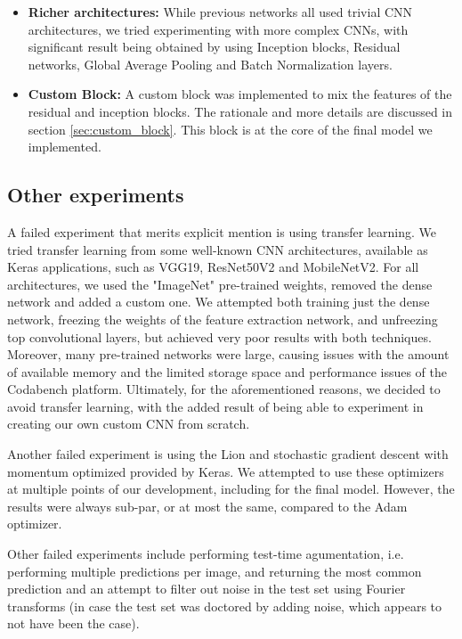 \documentclass[11pt]{article}
\begin{document}
\begin{multicols}{2}
\begin{itemize}
            \item \textbf{Richer architectures:} While previous networks all used trivial 
                  CNN architectures, we tried experimenting with more complex CNNs,
                  with significant result being obtained by using Inception blocks,
                  Residual networks, Global Average Pooling and Batch Normalization layers.
            \item \textbf{Custom Block:} A custom block was implemented to mix the 
                  features of the residual and inception blocks. The rationale and more
                  details are discussed in section \ref{sec:custom_block}. This block 
                  is at the core of the final model we implemented.
      \end{itemize}

      \subsection{Other experiments}

      A failed experiment that merits explicit mention is using transfer learning.
      We tried transfer learning from some well-known CNN architectures, available
      as Keras applications, such as VGG19, ResNet50V2 and MobileNetV2. For all
      architectures, we used the "ImageNet" pre-trained weights, removed the dense
      network and added a custom one. We attempted both training just the dense
      network, freezing the weights of the feature extraction network, and unfreezing
      top convolutional layers, but achieved very poor results with both techniques.
      Moreover, many pre-trained networks were large, causing issues with the amount
      of available memory and the limited storage space and performance issues of the
      Codabench platform. Ultimately, for the aforementioned reasons, we decided to 
      avoid transfer learning, with the added result of being able to experiment in
      creating our own custom CNN from scratch.

      Another failed experiment is using the Lion and stochastic gradient descent
      with momentum optimized provided by Keras. We attempted to use these optimizers
      at multiple points of our development, including for the final model. However,
      the results were always sub-par, or at most the same, compared to the Adam 
      optimizer.

      Other failed experiments include performing test-time agumentation, i.e. 
      performing multiple predictions per image, and returning the most common prediction 
      and an attempt to filter out noise in the test set using Fourier transforms (in case
      the test set was doctored by adding noise, which appears to not have been the case).


\end{multicols}
\end{document}
